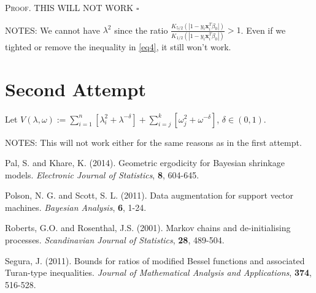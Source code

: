 \documentclass[12pt]{article}
\newcounter{ProofCounter}
\newenvironment{Proof}{\stepcounter{ProofCounter}\textsc{Proof.}}{\hfill$\square$}
\begin{document}
\begin{Proof}
  {\Large THIS WILL NOT WORK}
\end{Proof}

NOTES: We cannot have $\lambda^2$ since the ratio $\frac{K_{5/2}\left( |1 - y_i\bm{x}_i^T\beta_0| \right)}{K_{1/2}\left( |1 - y_i\bm{x}_i^T\beta_0|\right)} > 1$.
Even if we tighted or remove the inequality in \eqref{eq4}, it still won't work.

\newpage

\section{Second Attempt}

Let $V(\lambda, \omega) := \sum_{i=1}^{n}[\lambda_i^2 + \lambda^{-\delta}] + \sum_{i=j}^{k}[\omega_j^2 + \omega^{-\delta}]$, $\delta \in (0,1)$.

NOTES: This will not work either for the same reasons as in the first attempt.


\newpage

\begin{thebibliography}{9}
    Pal, S. and Khare, K. (2014). Geometric ergodicity for Bayesian shrinkage models. \emph{Electronic Journal of Statistics}, \textbf{8}, 604-645.

    Polson, N. G. and Scott, S. L. (2011). Data augmentation for support vector machines. \emph{Bayesian Analysis}, \textbf{6}, 1-24.

    Roberts, G.O. and Rosenthal, J.S. (2001). Markov chains and de-initialising processes. \emph{Scandinavian Journal of Statistics}, \textbf{28},
    489-504.

    Segura, J. (2011). Bounds for ratios of modified Bessel functions and associated Turan-type inequalities. \emph{Journal of Mathematical Analysis
    and Applications}, \textbf{374}, 516-528.
\end{thebibliography}
\end{document}
